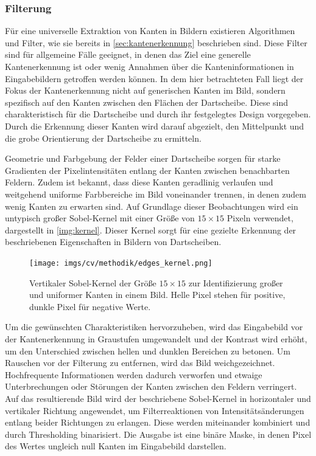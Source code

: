 \subsubsection{Filterung}
\label{sec:filterung}

Für eine universelle Extraktion von Kanten in Bildern existieren Algorithmen und Filter, wie sie bereits in \autoref{sec:kantenerkennung} beschrieben sind. Diese Filter sind für allgemeine Fälle geeignet, in denen das Ziel eine generelle Kantenerkennung ist oder wenig Annahmen über die Kanteninformationen in Eingabebildern getroffen werden können. In dem hier betrachteten Fall liegt der Fokus der Kantenerkennung nicht auf generischen Kanten im Bild, sondern spezifisch auf den Kanten zwischen den Flächen der Dartscheibe. Diese sind charakteristisch für die Dartscheibe und durch ihr festgelegtes Design vorgegeben. Durch die Erkennung dieser Kanten wird darauf abgezielt, den Mittelpunkt und die grobe Orientierung der Dartscheibe zu ermitteln.

Geometrie und Farbgebung der Felder einer Dartscheibe sorgen für starke Gradienten der Pixelintensitäten entlang der Kanten zwischen benachbarten Feldern. Zudem ist bekannt, dass diese Kanten geradlinig verlaufen und weitgehend uniforme Farbbereiche im Bild voneinander trennen, in denen zudem wenig Kanten zu erwarten sind. Auf Grundlage dieser Beobachtungen wird ein untypisch großer Sobel-Kernel mit einer Größe von $15 \times 15$ Pixeln verwendet, dargestellt in \autoref{img:kernel}. Dieser Kernel sorgt für eine gezielte Erkennung der beschriebenen Eigenschaften in Bildern von Dartscheiben.

\begin{figure}
    \centering
    \texttt{[image: imgs/cv/methodik/edges\_kernel.png]}
    \caption{Vertikaler Sobel-Kernel der Größe $15\times15$ zur Identifizierung großer und uniformer Kanten in einem Bild. Helle Pixel stehen für positive, dunkle Pixel für negative Werte.}
    \label{img:kernel}
\end{figure}

Um die gewünschten Charakteristiken hervorzuheben, wird das Eingabebild vor der Kantenerkennung in Graustufen umgewandelt und der Kontrast wird erhöht, um den Unterschied zwischen hellen und dunklen Bereichen zu betonen. Um Rauschen vor der Filterung zu entfernen, wird das Bild weichgezeichnet. Hochfrequente Informationen werden dadurch verworfen und etwaige Unterbrechungen oder Störungen der Kanten zwischen den Feldern verringert. Auf das resultierende Bild wird der beschriebene Sobel-Kernel in horizontaler und vertikaler Richtung angewendet, um Filterreaktionen von Intensitätsänderungen entlang beider Richtungen zu erlangen. Diese werden miteinander kombiniert und durch Thresholding binarisiert. Die Ausgabe ist eine binäre Maske, in denen Pixel des Wertes ungleich null Kanten im Eingabebild darstellen.

